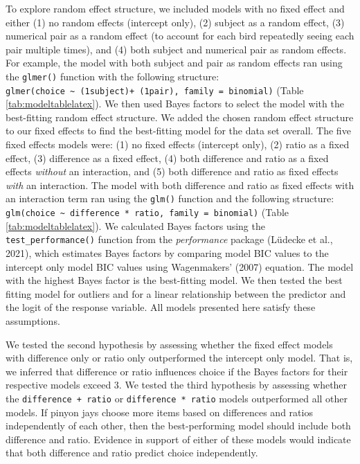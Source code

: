 \documentclass[
  ,pub,floatsintext]{apa6}
\begin{document}
To explore random effect structure, we included models with no fixed effect and either (1) no random effects (intercept only), (2) subject as a random effect, (3) numerical pair as a random effect (to account for each bird repeatedly seeing each pair multiple times), and (4) both subject and numerical pair as random effects. For example, the model with both subject and pair as random effects ran using the \texttt{glmer()} function with the following structure: \texttt{glmer(choice\ \textasciitilde{}\ (1\textbar{}subject)+\ (1\textbar{}pair),\ family\ =\ binomial)} (Table \ref{tab:modeltablelatex}). We then used Bayes factors to select the model with the best-fitting random effect structure. We added the chosen random effect structure to our fixed effects to find the best-fitting model for the data set overall. The five fixed effects models were: (1) no fixed effects (intercept only), (2) ratio as a fixed effect, (3) difference as a fixed effect, (4) both difference and ratio as a fixed effects \emph{without} an interaction, and (5) both difference and ratio as fixed effects \emph{with} an interaction. The model with both difference and ratio as fixed effects with an interaction term ran using the \texttt{glm()} function and the following structure: \texttt{glm(choice\ \textasciitilde{}\ difference\ *\ ratio,\ family\ =\ binomial)} (Table \ref{tab:modeltablelatex}). We calculated Bayes factors using the \texttt{test\_performance()} function from the \emph{performance} package (Lüdecke et al., 2021), which estimates Bayes factors by comparing model BIC values to the intercept only model BIC values using Wagenmakers' (2007) equation. The model with the highest Bayes factor is the best-fitting model. We then tested the best fitting model for outliers and for a linear relationship between the predictor and the logit of the response variable. All models presented here satisfy these assumptions.

We tested the second hypothesis by assessing whether the fixed effect models with difference only or ratio only outperformed the intercept only model. That is, we inferred that difference or ratio influences choice if the Bayes factors for their respective models exceed 3. We tested the third hypothesis by assessing whether the \texttt{difference\ +\ ratio} or \texttt{difference\ *\ ratio} models outperformed all other models. If pinyon jays choose more items based on differences and ratios independently of each other, then the best-performing model should include both difference and ratio. Evidence in support of either of these models would indicate that both difference and ratio predict choice independently.
\end{document}
